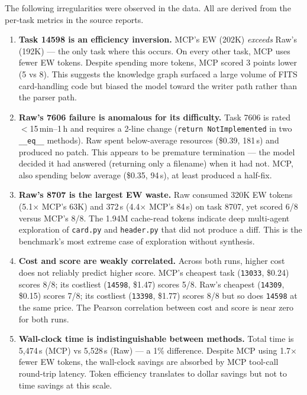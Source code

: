 The following irregularities were observed in the data.  All are
derived from the per-task metrics in the source reports.

\begin{enumerate}

\item \textbf{Task 14598 is an efficiency inversion.}
      MCP's EW (202K) \emph{exceeds} Raw's (192K) --- the only task
      where this occurs.  On every other task, MCP uses fewer EW tokens.
      Despite spending more tokens, MCP scored 3 points lower (5 vs 8).
      This suggests the knowledge graph surfaced a large volume of
      FITS card-handling code but biased the model toward the writer
      path rather than the parser path.

\item \textbf{Raw's 7606 failure is anomalous for its difficulty.}
      Task 7606 is rated $<$15\,min--1\,h and requires a 2-line change
      (\texttt{return NotImplemented} in two \texttt{\_\_eq\_\_}
      methods).  Raw spent below-average resources (\$0.39, 181\,s)
      and produced no patch.  This appears to be premature
      termination --- the model decided it had answered (returning
      only a filename) when it had not.  MCP, also spending below
      average (\$0.35, 94\,s), at least produced a half-fix.

\item \textbf{Raw's 8707 is the largest EW waste.}
      Raw consumed 320K EW tokens (5.1$\times$ MCP's 63K) and 372\,s
      (4.4$\times$ MCP's 84\,s) on task 8707, yet scored 6/8 versus
      MCP's 8/8.  The 1.94M cache-read tokens indicate deep
      multi-agent exploration of \texttt{card.py} and
      \texttt{header.py} that did not produce a diff.
      This is the benchmark's most extreme case of exploration
      without synthesis.

\item \textbf{Cost and score are weakly correlated.}
      Across both runs, higher cost does not reliably predict higher
      score.  MCP's cheapest task (\texttt{13033}, \$0.24) scores 8/8;
      its costliest (\texttt{14598}, \$1.47) scores 5/8.
      Raw's cheapest (\texttt{14309}, \$0.15) scores 7/8; its
      costliest (\texttt{13398}, \$1.77) scores 8/8 but so does
      \texttt{14598} at the same price.
      The Pearson correlation between cost and score is near zero for
      both runs.

\item \textbf{Wall-clock time is indistinguishable between methods.}
      Total time is 5{,}474\,s (MCP) vs 5{,}528\,s (Raw) --- a 1\%
      difference.  Despite MCP using 1.7$\times$ fewer EW tokens,
      the wall-clock savings are absorbed by MCP tool-call round-trip
      latency.  Token efficiency translates to dollar savings but not
      to time savings at this scale.


\end{enumerate}
